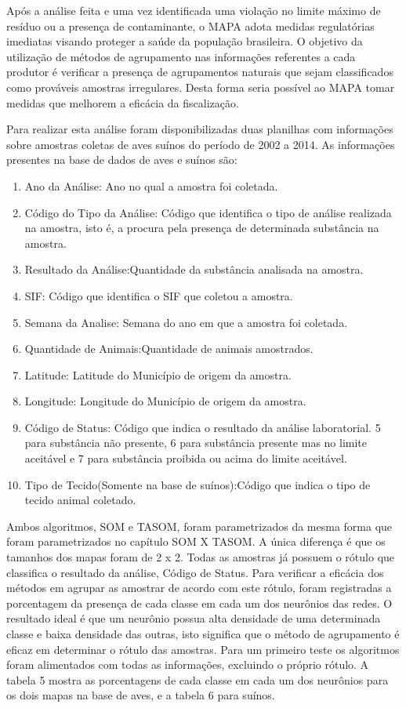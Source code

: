 Após a análise feita e uma vez identificada uma violação no limite máximo de resíduo ou a presença de contaminante, o MAPA adota medidas regulatórias imediatas visando proteger a saúde da população brasileira. O objetivo da utilização de métodos de agrupamento nas informações referentes a cada produtor é verificar a presença de agrupamentos naturais que sejam classificados como prováveis amostras irregulares. Desta forma seria possível ao MAPA tomar medidas que melhorem a eficácia da fiscalização.

Para realizar esta análise foram disponibilizadas duas planilhas com informações sobre amostras coletas de aves suínos do período de 2002 a 2014. As informações presentes na base de dados de aves e suínos são:

\begin{enumerate}
\item Ano da Análise: Ano no qual a amostra foi coletada.
\item Código do Tipo da Análise: Código que identifica o tipo de análise realizada na amostra, isto é, a procura pela presença de determinada substância na amostra.
\item Resultado da Análise:Quantidade da substância analisada na amostra.
\item SIF: Código que identifica o SIF que coletou a amostra.
\item Semana da Analise: Semana do ano em que a amostra foi coletada.
\item Quantidade de Animais:Quantidade de animais amostrados.
\item Latitude: Latitude do Município de origem da amostra.
\item Longitude: Longitude do Município de origem da amostra.
\item Código de Status: Código que indica o resultado da análise laboratorial. 5 para substância não presente, 6 para substância presente mas no limite aceitável e 7 para substância proibida ou acima do limite aceitável.
\item Tipo de Tecido(Somente na base de suínos):Código que indica o tipo de tecido animal coletado.
\end{enumerate}

Ambos algoritmos, SOM e TASOM, foram parametrizados da mesma forma que foram parametrizados no capítulo SOM X TASOM. A única diferença é que os tamanhos dos mapas foram de 2 x 2. Todas as amostras já possuem o rótulo que classifica o resultado da análise, Código de Status. Para verificar a eficácia dos métodos em agrupar as amostrar de acordo com este rótulo, foram registradas a porcentagem da presença de cada classe em cada um dos neurônios das redes. O resultado ideal é que um neurônio possua alta densidade de uma determinada classe e baixa densidade das outras, isto significa que o método de agrupamento é eficaz em determinar o rótulo das amostras. Para um primeiro teste os algoritmos foram alimentados com todas as informações, excluindo o próprio rótulo. A tabela 5 mostra as porcentagens de cada classe em cada um dos neurônios para os dois mapas na base de aves, e a tabela 6 para suínos. 

